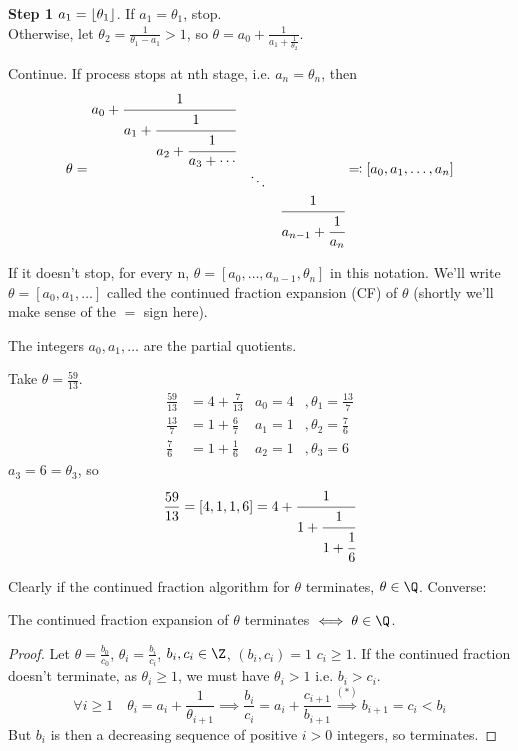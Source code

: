 \documentclass{article}
\DeclarePairedDelimiter\floor{\lfloor}{\rfloor}
\begin{document}
\textbf{Step 1}
$a_1 = \floor{\theta_1}$. If $a_1 = \theta_1$, stop.  \\
Otherwise, let $\theta_2 = \frac{1}{\theta_1 - a_1} > 1$, so $\theta = a_0 + \frac{1}{a_1 + \frac{1}{\theta_2}}$.

Continue. If process stops at nth stage, i.e. $a_n = \theta_n$, then
\begin{equation*}
    \theta =
    \begin{matrix}
        a_0 + \cfrac{1}{a_1 + \cfrac{1}{a_2 + \cfrac{1}{a_3 + \dotsb}}} &&\\
                                                                                 &\ddots &\\
                                                                                 &&\cfrac{1}{a_{n-1} + \cfrac{1}{a_n}}
    \end{matrix}
    \eqqcolon[a_0, a_1, \dotsc, a_n]
\end{equation*}

If it doesn't stop, for every n, $\theta = [a_0, \dotsc, a_{n-1}, \theta_n]$ in this notation.
We'll write $\theta=[a_0, a_1, \dotsc]$ called the continued fraction expansion (CF) of $\theta$ (shortly we'll make sense of the $=$ sign here).

The integers $a_0, a_1, \dotsc$ are the partial quotients.

\begin{eg}
    Take $\theta = \frac{59}{13}$.
    \begin{align*}
        \frac{59}{13} &= 4 + \frac{7}{13} & a_0 = 4&, \theta_1 = \frac{13}{7} \\
        \frac{13}{7} &= 1 + \frac{6}{7} & a_1 = 1&, \theta_2 = \frac{7}{6} \\
        \frac{7}{6} &= 1 + \frac{1}{6} & a_2 = 1&, \theta_3 = 6
    \end{align*}
    $a_3 = 6 = \theta_3$, so
    \begin{equation*}
        \frac{59}{13} = [4,1,1,6] = 4 + \cfrac{1}{1 + \cfrac{1}{1 + \cfrac{1}{6}}}
    \end{equation*}
\end{eg}

Clearly if the continued fraction algorithm for $\theta$ terminates, $\theta \in \Q$. Converse:
\begin{nprop}\label{prop:6.1}
    The continued fraction expansion of $\theta$ terminates $\iff \theta \in \Q$.
\end{nprop}
\begin{proof}
    Let $\theta = \frac{b_0}{c_0}$, $\theta_i = \frac{b_i}{c_i}$, $b_i, c_i \in \Z$, $(b_i, c_i) = 1$ $c_i \geq 1$.
    If the continued fraction doesn't terminate, as $\theta_i \geq 1$, we must have $\theta_i > 1$ i.e. $b_i > c_i$.
    \begin{equation*}
        \forall i \geq 1 \quad \theta_i = a_i + \frac{1}{\theta_{i+1}} \implies \frac{b_i}{c_i} = a_i + \frac{c_{i+1}}{b_{i+1}} \overset{(*)}{\implies} b_{i+1} = c_i < b_i
    \end{equation*}
    But $b_i$ is then a decreasing sequence of positive $i > 0$ integers, so terminates.
\end{proof}
\end{document}
